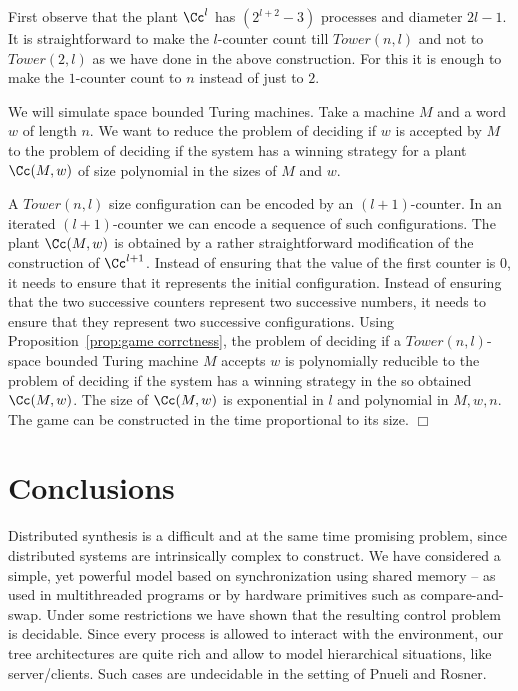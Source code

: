 \documentclass{llncs}
\newcommand{\Tower}{\mathit{Tower}}
\renewenvironment{proof}{{\em Proof. }}{\nopagebreak
  \hspace*{\fill}$\Box$}
\begin{document}
\begin{proof}
  First observe that the plant $\Cc^l$ has $(2^{l+2}-3)$ processes
  and diameter $2l-1$. It is straightforward to make the
  $l$-counter count till $\Tower(n,l)$ and not to $\Tower(2,l)$ as we
  have done in the above construction. For this it is enough to make
  the $1$-counter count to $n$ instead of just to $2$.

  We will simulate space bounded Turing machines.  Take a machine $M$
  and a word $w$ of length $n$. We want to reduce the problem of
  deciding if $w$ is accepted by $M$ to the problem of deciding if the
  system  has a winning strategy for a plant $\Cc(M,w)$ of size
  polynomial in the sizes of $M$ and $w$. 

  A $\Tower(n,l)$ size configuration can be encoded by an
  $(l+1)$-counter. In an iterated $(l+1)$-counter we can encode a
  sequence of such configurations. The plant $\Cc(M,w)$ is obtained by a
  rather straightforward modification of the construction of
  $\Cc^{l+1}$. Instead of ensuring that the value of the first counter
  is $0$, it needs to ensure that it represents the initial
  configuration. Instead of ensuring that the two successive counters
  represent two successive numbers, it needs to ensure that they
  represent two successive configurations.  Using
  Proposition~\ref{prop:game corrctness}, the problem of deciding if
  a $\Tower(n,l)$-space bounded Turing machine $M$ accepts $w$ is
  polynomially reducible to the problem of deciding if the system has a
  winning strategy in the so obtained $\Cc(M,w)$. The size of $\Cc(M,w)$
  is exponential in $l$ and polynomial in $M,w,n$. The game can be
  constructed in the time proportional to its size.
\end{proof}







\section{Conclusions}

Distributed synthesis is a difficult and at the same time
promising problem, since distributed systems are intrinsically complex
to construct. We have considered  a simple, yet powerful model based on synchronization using shared memory --
as used in multithreaded programs or by  hardware primitives
such as compare-and-swap. 
Under some restrictions we have shown that the resulting control
problem is decidable. Since every process is allowed to interact with
the environment, our tree architectures are quite rich and allow to
model hierarchical situations, like server/clients. Such cases
are undecidable in the setting of Pnueli and Rosner. 
\end{document}
